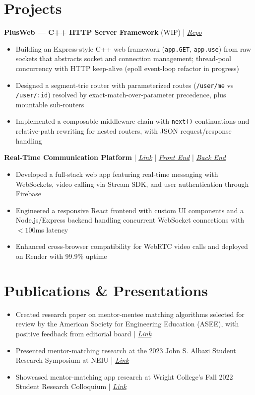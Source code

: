 \documentclass[10pt,letterpaper]{article}
\begin{document}
\section*{Projects}
\noindent\textbf{PlusWeb --- C++ HTTP Server Framework} (WIP) | \href{https://github.com/Amsozzer1/PlusWeb}{\textit{Repo}}
\begin{itemize}[leftmargin=14pt]
  \item Building an Express-style C++ web framework (\texttt{app.GET}, \texttt{app.use}) from raw sockets that abstracts socket and connection management; thread-pool concurrency with HTTP keep-alive (epoll event-loop refactor in progress)
  \item Designed a segment-trie router with parameterized routes (\texttt{/user/me} vs \texttt{/user/:id}) resolved by exact-match-over-parameter precedence, plus mountable sub-routers
  \item Implemented a composable middleware chain with \texttt{next()} continuations and relative-path rewriting for nested routers, with JSON request/response handling
\end{itemize}
\vspace{0.2em}
\noindent\textbf{Real-Time Communication Platform} | \href{https://whatsapp-16bff.firebaseapp.com/}{\textit{Link}} | \href{https://github.com/Amsozzer1/Whats_app_clone}{\textit{Front End}} | \href{https://github.com/Amsozzer1/Whats_app_clone_backend}{\textit{Back End}}
\begin{itemize}[leftmargin=14pt]
  \item Developed a full-stack web app featuring real-time messaging with WebSockets, video calling via Stream SDK, and user authentication through Firebase
  \item Engineered a responsive React frontend with custom UI components and a Node.js/Express backend handling concurrent WebSocket connections with ${<}100$ms latency
  \item Enhanced cross-browser compatibility for WebRTC video calls and deployed on Render with 99.9\% uptime
\end{itemize}
\section*{Publications \& Presentations}
\begin{itemize}
  \item Created research paper on mentor-mentee matching algorithms selected for review by the American Society for Engineering Education (ASEE), with positive feedback from editorial board | \textit{\href{https://peer.asee.org/board-177-work-in-progress-the-development-of-a-research-based-application-for-effective-mentor-mentee-matching.pdf}{Link}}
  \item Presented mentor-matching research at the 2023 John S. Albazi Student Research Symposium at NEIU | \href{https://neiudc.neiu.edu/srcas/2023/s06/4/}{\textit{Link}}
  \item Showcased mentor-matching app research at Wright College's Fall 2022 Student Research Colloquium | \href{https://www.ccc.edu/wp-content/uploads/wright_departments_Documents_Honors-at-Wright_Student-Colloquium-Program-Fall-2022.pdf}{\textit{Link}}
\end{itemize}
\end{document}
